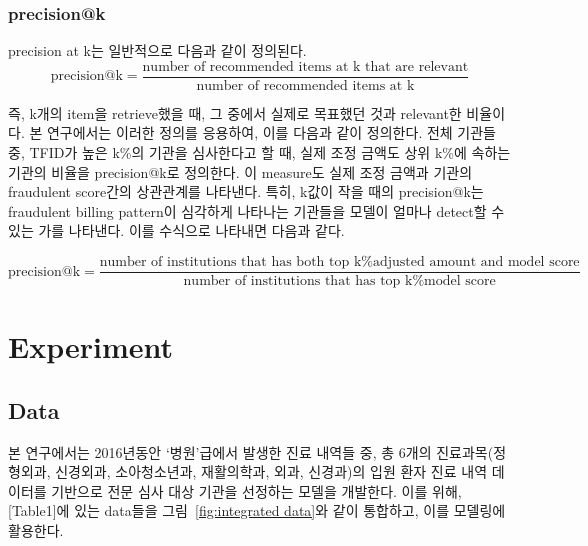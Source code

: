 \documentclass[11pt]{article}           %
\begin{document}
\subsubsection{precision@k}
\label{3.2.2}

precision at k는 일반적으로 다음과 같이 정의된다.
\[
 \text{precision@k} = \frac{\text{number of recommended items at k that are relevant}}{\text{number of recommended items at k}}
\]

즉, k개의 item을 retrieve했을 때, 그 중에서 실제로 목표했던 것과 relevant한 비율이다.
본 연구에서는 이러한 정의를 응용하여, 이를 다음과 같이 정의한다.
전체 기관들 중, TFID가 높은 k\%의 기관을 심사한다고 할 때, 실제 조정 금액도 상위 k\%에 속하는 기관의 비율을 precision@k로 정의한다.
이 measure도 실제 조정 금액과 기관의 fraudulent score간의 상관관계를 나타낸다.
특히, k값이 작을 때의 precision@k는 fraudulent billing pattern이 심각하게 나타나는 기관들을 모델이 얼마나 detect할 수 있는 가를 나타낸다.
이를 수식으로 나타내면 다음과 같다.

\[
 \text{precision@k} = \frac{\text{number of institutions that has both top k\% adjusted amount and model score}}{\text{number of institutions that has top k\% model score}}
\]

\section{Experiment}
\label{4}
\subsection{Data}
\label{4.1}

본 연구에서는 2016년동안 ‘병원’급에서 발생한 진료 내역들 중, 총 6개의 진료과목(정형외과, 신경외과, 소아청소년과, 재활의학과, 외과, 신경과)의 입원 환자 진료 내역 데이터를 기반으로 전문 심사 대상 기관을 선정하는 모델을 개발한다.
이를 위해, [Table1]에 있는 data들을 그림~\ref{fig:integrated data}와 같이 통합하고, 이를 모델링에 활용한다.
\end{document}
